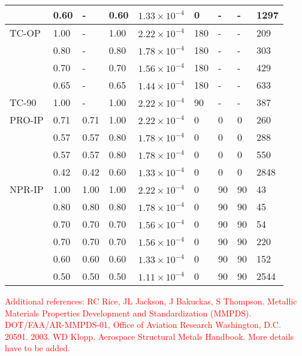 \documentclass[preprint,5p,twocolumn,11pt,sort&compress]{elsarticle}
\newcommand{\marked}[1]{\textcolor{red}{#1}}
\begin{document}
\begin{table*}[htbp]
\begin{tabular}{p{2cm}p{1.5cm}p{1.5cm}p{1.5cm}p{2.5cm}p{1cm}p{1cm}p{1cm}p{1cm}}
          & 0.60  & -     & 0.60  & $1.33\times 10^{-4}$ & 0     & -     & -     & 1297 \\
    \hline
    TC-OP & 1.00  & -     & 1.00  & $2.22\times 10^{-4}$ & 180   & -     & -     & 209 \\
          & 0.80  & -     & 0.80  & $1.78\times 10^{-4}$ & 180   & -     & -     & 303 \\
          & 0.70  & -     & 0.70  & $1.56\times 10^{-4}$ & 180   & -     & -     & 429 \\
          & 0.65  & -     & 0.65  & $1.44\times 10^{-4}$ & 180   & -     & -     & 633 \\
    \hline
    TC-90 & 1.00  & -     & 1.00  & $2.22\times 10^{-4}$ & 90    & -     & -     & 387 \\
    \hline
    PRO-IP & 0.71  & 0.71  & 1.00  & $2.22\times 10^{-4}$ & 0     & 0     & 0     & 260 \\
          & 0.57  & 0.57  & 0.80  & $1.78\times 10^{-4}$ & 0     & 0     & 0     & 288 \\
          & 0.57  & 0.57  & 0.80  & $1.78\times 10^{-4}$ & 0     & 0     & 0     & 550 \\
          & 0.42  & 0.42  & 0.60  & $1.33\times 10^{-4}$ & 0     & 0     & 0     & 2848 \\
    \hline
    NPR-IP & 1.00  & 1.00  & 1.00  & $2.22\times 10^{-4}$ & 0     & 90    & 90    & 43 \\
          & 0.80  & 0.80  & 0.80  & $1.78\times 10^{-4}$ & 0     & 90    & 90    & 45 \\
          & 0.70  & 0.70  & 0.70  & $1.56\times 10^{-4}$ & 0     & 90    & 90    & 54 \\
          & 0.70  & 0.70  & 0.70  & $1.56\times 10^{-4}$ & 0     & 90    & 90    & 220 \\
          & 0.60  & 0.60  & 0.60  & $1.33\times 10^{-4}$ & 0     & 90    & 90    & 152 \\
          & 0.50  & 0.50  & 0.50  & $1.11\times 10^{-4}$ & 0     & 90    & 90    & 2544 \\
    \hline
    \end{tabular}%
  \label{Tab:TestMatrix}%
\end{table*}%


\marked{Additional references:
RC Rice, JL Jackson, J Bakuckas, S Thompson.
Metallic Materials Properties
Development and Standardization
(MMPDS). DOT/FAA/AR-MMPDS-01, Office of Aviation Research
Washington, D.C. 20591. 2003.
\newline
WD Klopp. Aerospace Structural Metals Handbook. More details have to be added.}
\end{document}

